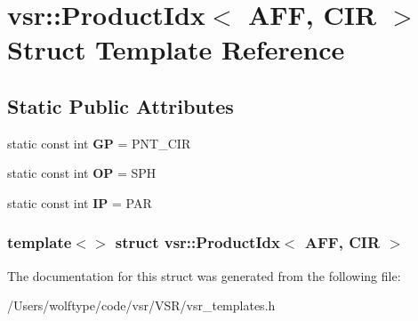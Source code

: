 \hypertarget{structvsr_1_1_product_idx_3_01_a_f_f_00_01_c_i_r_01_4}{\section{vsr\-:\-:Product\-Idx$<$ A\-F\-F, C\-I\-R $>$ Struct Template Reference}
\label{structvsr_1_1_product_idx_3_01_a_f_f_00_01_c_i_r_01_4}
}
\subsection*{Static Public Attributes}
\begin{DoxyCompactItemize}
\item 
\hypertarget{structvsr_1_1_product_idx_3_01_a_f_f_00_01_c_i_r_01_4_aca87b917a94539fc79ac76ddfd1f24cf}{static const int {\bfseries G\-P} = P\-N\-T\-\_\-\-C\-I\-R}\label{structvsr_1_1_product_idx_3_01_a_f_f_00_01_c_i_r_01_4_aca87b917a94539fc79ac76ddfd1f24cf}

\item 
\hypertarget{structvsr_1_1_product_idx_3_01_a_f_f_00_01_c_i_r_01_4_adeec9b965d8f58441b107f98240f97b7}{static const int {\bfseries O\-P} = S\-P\-H}\label{structvsr_1_1_product_idx_3_01_a_f_f_00_01_c_i_r_01_4_adeec9b965d8f58441b107f98240f97b7}

\item 
\hypertarget{structvsr_1_1_product_idx_3_01_a_f_f_00_01_c_i_r_01_4_a86ed56669b522d2ecc76f30cb68b9ee7}{static const int {\bfseries I\-P} = P\-A\-R}\label{structvsr_1_1_product_idx_3_01_a_f_f_00_01_c_i_r_01_4_a86ed56669b522d2ecc76f30cb68b9ee7}

\end{DoxyCompactItemize}
\subsubsection*{template$<$$>$ struct vsr\-::\-Product\-Idx$<$ A\-F\-F, C\-I\-R $>$}



The documentation for this struct was generated from the following file\-:\begin{DoxyCompactItemize}
\item 
/\-Users/wolftype/code/vsr/\-V\-S\-R/vsr\-\_\-templates.\-h\end{DoxyCompactItemize}
